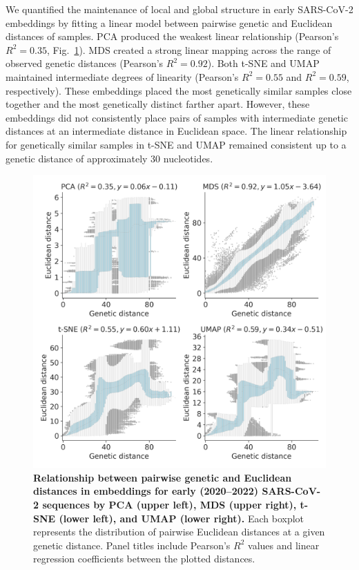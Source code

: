 \documentclass[webpdf,contemporary,large,single]{oup-authoring-template}%
\theoremstyle{thmstyleone}%
\theoremstyle{thmstyletwo}%
\theoremstyle{thmstylethree}%
\begin{document}
We quantified the maintenance of local and global structure in early SARS-CoV-2 embeddings by fitting a linear model between pairwise genetic and Euclidean distances of samples.
PCA produced the weakest linear relationship (Pearson's $R^{2}=0.35$, Fig.~\ref{fig:sars-cov-2-pairwise-distances}).
MDS created a strong linear mapping across the range of observed genetic distances (Pearson's $R^{2}=0.92$).
Both t-SNE and UMAP maintained intermediate degrees of linearity (Pearson's $R^{2}=0.55$ and $R^{2}=0.59$, respectively).
These embeddings placed the most genetically similar samples close together and the most genetically distinct farther apart.
However, these embeddings did not consistently place pairs of samples with intermediate genetic distances at an intermediate distance in Euclidean space.
The linear relationship for genetically similar samples in t-SNE and UMAP remained consistent up to a genetic distance of approximately 30 nucleotides.

\begin{figure}[!h]
\includegraphics[width=\columnwidth]{figures/sarscov2-euclidean-distance-by-genetic-distance.png}
\caption{{\bf Relationship between pairwise genetic and Euclidean distances in embeddings for early (2020--2022) SARS-CoV-2 sequences by PCA (upper left), MDS (upper right), t-SNE (lower left), and UMAP (lower right).}
  Each boxplot represents the distribution of pairwise Euclidean distances at a given genetic distance.
  Panel titles include Pearson's $R^{2}$ values and linear regression coefficients between the plotted distances.
}
\label{fig:sars-cov-2-pairwise-distances}
\end{figure}
\end{document}
